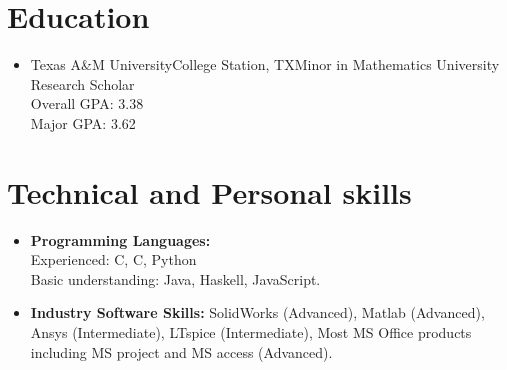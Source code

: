 \documentclass[11pt,a4paper,sans]{moderncv}
\begin{document}
\section{Education}

\vspace{5pt}

\begin{itemize}

  \item{
    {Texas A\&M University}{College Station, TX}{Minor in Mathematics}
    {University Research Scholar \\ Overall GPA: 3.38 \\ Major GPA: 3.62}}

\end{itemize}

\section{Technical and Personal skills}

\vspace{6pt}

\begin{itemize}

\newcommand{\Rplus}{\protect\hspace{-.1em}\protect\raisebox{.35ex}{\smaller{\smaller\textbf{+}}}}
\newcommand{\Cpp}{\mbox{C\Rplus\Rplus}\xspace}

\item \textbf{Programming Languages:} \\
  Experienced: \Cpp, C, Python \\
  Basic understanding: Java, Haskell, JavaScript.

\vspace{6pt}

\item \textbf{Industry Software Skills:} SolidWorks (Advanced), Matlab (Advanced), Ansys (Intermediate),  LTspice (Intermediate), Most MS Office products including MS project and MS access (Advanced).

\end{itemize}



%
%
%
%
\end{document}
